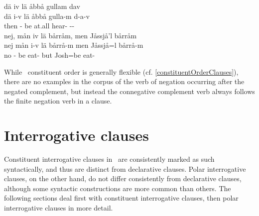  
\z
\ea\label{negation5}%
\glll	dä iv lä åbbå gullam dav\\
	dä i-v lä åbbå gulla-m d-a-v\\
	then - be\BS{} at.all hear- --\\\nopagebreak
{} 
\z
\ea\label{negation6}%
\glll	nej, mån iv lä bårråm, men Jåssjå'l bårråm\\
	nej mån i-v lä bårrå-m men Jåssjå=l bårrå-m\\
	no  - be\BS{} eat- but Josh\BS{}=be\BS{} eat-\\\nopagebreak
{} 
\z

While \PS\ constituent order is generally flexible (cf. \SEC\ref{constituentOrderClauses}), there are no examples in the corpus of the verb of negation occurring after the negated complement, but instead the connegative complement verb always follows the finite negation verb in a clause. 

\section{Interrogative clauses}\label{interrogClauses}
Constituent interrogative clauses in \PS\ are consistently marked as such syntactically, and thus are distinct from declarative clauses. Polar interrogative clauses, on the other hand, do not differ consistently from declarative clauses, although some syntactic constructions are more common than others. The following sections deal first with constituent interrogative clauses, then polar interrogative clauses in more detail.

